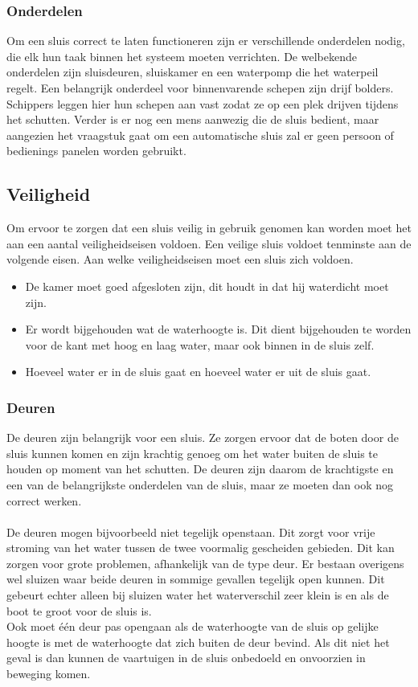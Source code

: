 \documentclass{article}
\begin{document}
\subsubsection{Onderdelen}
Om een sluis correct te laten functioneren zijn er verschillende onderdelen nodig, die elk hun taak binnen het systeem moeten verrichten. De welbekende onderdelen zijn sluisdeuren,  sluiskamer en een waterpomp die het waterpeil regelt. Een belangrijk onderdeel voor binnenvarende schepen zijn drijf bolders. Schippers leggen hier hun schepen aan vast zodat ze op een plek drijven tijdens het schutten. Verder is er nog een mens aanwezig die de sluis bedient, maar aangezien het vraagstuk gaat om een automatische sluis zal er geen persoon of bedienings panelen worden gebruikt.

\subsection{Veiligheid}
Om ervoor te zorgen dat een sluis veilig in gebruik genomen kan worden moet het aan een aantal veiligheidseisen voldoen. Een veilige sluis voldoet tenminste aan de volgende eisen.
Aan welke veiligheidseisen moet een sluis zich voldoen.
\begin{itemize}
\item De kamer moet goed afgesloten zijn, dit houdt in dat hij waterdicht moet zijn.
\item Er wordt bijgehouden wat de waterhoogte is. Dit dient bijgehouden te worden voor de kant met hoog en laag water, maar ook binnen in de sluis zelf.
\item Hoeveel water er in de sluis gaat en hoeveel water er uit de sluis gaat.
\end{itemize}

\subsubsection{Deuren}
De deuren zijn belangrijk voor een sluis. Ze zorgen ervoor dat de boten door de sluis kunnen komen en zijn krachtig genoeg om het water buiten de sluis te houden op moment van het schutten. De deuren zijn daarom de krachtigste en een van de belangrijkste onderdelen van de sluis, maar ze moeten dan ook nog correct werken.
\\\\
De deuren mogen bijvoorbeeld niet tegelijk openstaan. Dit zorgt voor vrije stroming van het water tussen de twee voormalig gescheiden gebieden. Dit kan zorgen voor grote problemen, afhankelijk van de type deur.  Er bestaan overigens wel sluizen waar beide deuren in sommige gevallen tegelijk open kunnen. Dit gebeurt echter alleen bij sluizen water het waterverschil zeer klein is en als de boot te groot voor de sluis is.\\
Ook moet één deur pas opengaan als de waterhoogte van de sluis op gelijke hoogte is met de waterhoogte dat zich buiten de deur bevind. Als dit niet het geval is dan kunnen de vaartuigen in de sluis onbedoeld en onvoorzien in beweging komen.
\end{document}
